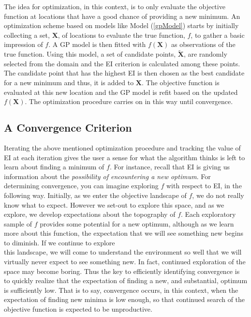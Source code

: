 \documentclass[12pt]{article}
\begin{document}
	The idea for optimization, in this context, is to only evaluate the objective function at locations that have a good chance of providing a new minimum. 
	An optimization scheme based on models like Model (\ref{gpModel}) starts by initially collecting a set, $\bm{X}$, of locations to evaluate the true function, $f$, to gather a basic impression of $f$.
	A GP model is then fitted with $f(\bm{X})$ as observations of the true function.
	Using this model, a set of candidate points, $\tilde{\bm{X}}$, are randomly selected from the domain and the EI criterion is calculated among these points.
	The candidate point that has the highest EI is then chosen as the best candidate for a new minimum and thus, it is added to $\bm{X}$.
	The objective function is evaluated at this new location and the GP model is refit based on the updated $f(\bm{X})$.
	The optimization procedure carries on in this way until convergence.

	
	\subsection{A Convergence Criterion}
	
	
	Iterating the above mentioned optimization procedure and tracking the value of EI at each iteration gives the user a sense for what the algorithm thinks is left to learn about finding a minimum of $f$.
	For instance, recall that EI is giving us information about the {\it possibility of encountering a new optimum}.
	For determining convergence, you can imagine exploring $f$ with respect to EI, in the following way.
	Initially, as we enter the objective landscape of $f$, we do not really know what to expect.
	However we set-out to explore this space, and as we explore, we develop expectations about the topography of $f$.
	Each exploratory sample of $f$ provides some potential for a new optimum, although as we learn more about this function, the expectation that we will see something new begins to diminish.
	If we continue to explore\\ this landscape, we will come to understand the environment so well that we will virtually never expect to see something new.
	In fact, continued exploration of the space may become boring.
	Thus the key to efficiently identifying convergence is to quickly realize that the expectation of finding a new, and substantial, optimum is sufficiently low.
	That is to say, convergence occurs, in this context, when the expectation of finding new minima is low enough, so that continued search of the objective function is expected to be unproductive.
\end{document}
